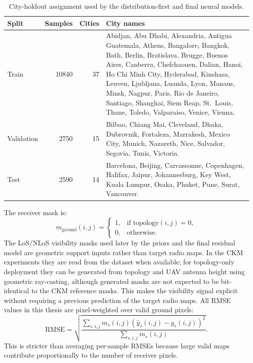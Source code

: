 \begin{table}[ht]
\centering
\scriptsize
\caption{City-holdout assignment used by the distribution-first and final neural models.}
\label{tab:split_city_assignment}
\begin{tabularx}{\textwidth}{lrrX}
\toprule
Split & Samples & Cities & City names \\
\midrule
Train & 10840 & 37 & Abidjan, Abu Dhabi, Alexandria, Antigua Guatemala,
Athens, Bangalore, Bangkok, Bath, Berlin, Bratislava, Brugge, Buenos Aires,
Canberra, Chefchaouen, Dalian, Hanoi, Ho Chi Minh City, Hyderabad, Kinshasa,
Leuven, Ljubljana, Luanda, Lyon, Manaus, Minsk, Nagpur, Paris,
Rio de Janeiro, Santiago, Shanghai, Siem Reap, St.~Louis, Thane, Toledo,
Valparaiso, Venice, Vienna. \\
Validation & 2750 & 15 & Bilbao, Chiang Mai, Cleveland, Dhaka, Dubrovnik,
Fortaleza, Marrakesh, Mexico City, Munich, Nazareth, Nice, Salvador, Segovia,
Tunis, Victoria. \\
Test & 2590 & 14 & Barcelona, Beijing, Carcassonne, Copenhagen, Halifax,
Jaipur, Johannesburg, Key West, Kuala Lumpur, Osaka, Phuket, Pune, Surat,
Vancouver. \\
\bottomrule
\end{tabularx}
\normalsize
\end{table}

The receiver mask is:
\begin{equation}
  m_{\mathrm{ground}}(i,j) =
  \begin{cases}
    1, & \text{if } \mathrm{topology}(i,j)=0,\\
    0, & \text{otherwise.}
  \end{cases}
  \label{eq:ground_mask}
\end{equation}
The LoS/NLoS visibility masks used later by the priors and the final
residual model are geometric support inputs rather than target radio maps. In
the CKM experiments they are read from the dataset when available; for
topology-only deployment they can be generated from topology and UAV antenna
height using geometric ray-casting, although generated masks are not expected
to be bit-identical to the CKM reference masks. This makes the visibility
signal explicit without requiring a previous prediction of the target radio
maps.
All RMSE values in this thesis are pixel-weighted over valid ground pixels:
\begin{equation}
  \mathrm{RMSE}
  =
  \sqrt{
  \frac{\sum_{s,i,j} m_s(i,j)\left(\hat y_s(i,j)-y_s(i,j)\right)^2}
       {\sum_{s,i,j} m_s(i,j)}
  }.
  \label{eq:rmse}
\end{equation}
This is stricter than averaging per-sample RMSEs because large valid maps
contribute proportionally to the number of receiver pixels.

